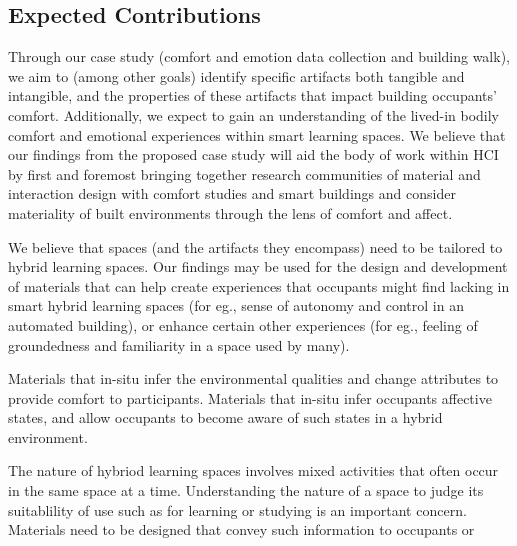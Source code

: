 \documentclass[acmconf, anonymous, review]{acmart}
\begin{document}
\subsection{Expected Contributions}
Through our case study (comfort and emotion data collection and building walk), we aim to (among other goals) identify specific artifacts both tangible and intangible, and the properties of these artifacts that impact building occupants' comfort. Additionally, we expect to gain an understanding of the lived-in bodily comfort and emotional experiences within smart learning spaces. We believe that our findings from the proposed case study will aid the body of work within HCI by first and foremost bringing together research communities of material and interaction design with comfort studies and smart buildings and consider materiality of built environments through the lens of comfort and affect. 

We believe that spaces (and the artifacts they encompass) need to be tailored to hybrid learning spaces. Our findings may be used for the design and development of materials that can help create experiences that occupants might find lacking in smart hybrid learning spaces (for eg., sense of autonomy and control in an automated building), or enhance certain other experiences (for eg., feeling of groundedness and familiarity in a space used by many). 





Materials that in-situ infer the environmental qualities and change attributes to provide comfort to participants. Materials that in-situ infer occupants affective states, and allow occupants to become aware of such states in a hybrid environment. 

The nature of hybriod learning spaces involves mixed activities that often occur in the same space at a time. Understanding the nature of a space to judge its suitablility of use such as for learning or studying is an important concern. Materials need to be designed that convey such information to occupants or 
\end{document}
